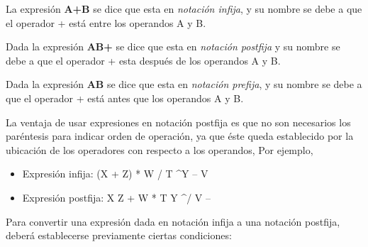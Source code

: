 \begin{definicion}
La expresión  \textbf{A+B} se dice que esta en \textit{notación infija}, y su nombre se debe a que el operador + está entre los operandos A y B.

Dada la expresión \textbf{AB+} se dice que esta en \textit{notación postfija} y su nombre se debe a que el operador + esta después de los operandos A y B.

Dada la expresión \textbf{AB} se dice que esta en \textit{notación prefija}, y su nombre se debe a que el operador + está antes que los operandos A y B.

\end{definicion}

La ventaja de usar expresiones en notación postfija es que no son necesarios los paréntesis para indicar orden de operación, ya que éste queda establecido por la ubicación de los operadores con respecto a los operandos, Por ejemplo,

\begin{itemize}
\item Expresión infija:	(X + Z) * W / T \textasciicircum Y – V
\item Expresión postfija:	X Z + W * T Y \textasciicircum / V –
\end{itemize}

Para convertir una expresión dada en notación infija a una notación postfija, deberá establecerse previamente ciertas condiciones:

